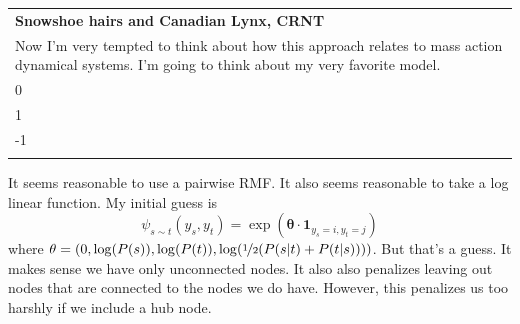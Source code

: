 \documentclass[10pt]{article}
\theoremstyle{definition}
\numberwithin{theorem}{section}
\numberwithin{definition}{section}
\numberwithin{lemma}{section}
\numberwithin{corollary}{section}
\numberwithin{clm}{section}
\numberwithin{rmk}{section}
\newenvironment{inbox}[1]
{\begin{center}
		\begin{tabular}{|p{0.9\textwidth}|}
			\hline
			{\bf #1}\\
		}
		{ 
			\\\\\hline
		\end{tabular} 
	\end{center}
}
\newcommand{\nhalf}{\nicefrac{1}{2}}
\renewcommand{\b}{\bm}
\newcommand{\ka}{\kappa}
\begin{document}
\begin{inbox}{Snowshoe hairs and Canadian Lynx, CRNT}
Now I'm very tempted to think about how this approach relates to mass action dynamical systems. I'm going to think about my very favorite model.
\[
\b{\dot{x}} = \ka_1 x \begin{pmatrix} 1 \\ 0 \end{pmatrix} + \ka_2 xy \begin{pmatrix}
-1 \\ 1
\end{pmatrix} + \ka_3 y \begin{pmatrix}
0\\-1
\end{pmatrix}
\]
Well. Yes. But there is only one maximal clique so $P(\b{x}) = \psi (\b{x})$ and that's just whatever it is. We know that it evolves according to the stochastic mass action equations. In fact, the result that the stationary distribution is a product of poissons for a complex balanced system can be thought of as fitting into this framework. I wonder if you could use this theory to re-prove that? Recall that the stationary distribution for a complex balanced system with equilibrium $\b{c}$ is 
\[
\pi(\b{x}) = \frac{1}{Z} \prod_{i=1}^d \frac{c_i^{x_i}}{x_i!}
\]
so here we have that
\[
\psi_c = \prod_{i \in c} \frac{c_i^{x_i}}{x_i!}
\]
or taking cliques to be just singletons
\[
\psi_i = \frac{c_i^{x_i}}{x_i !}
\]	
I can't think of any way to arrive upon that directly, and so prove the result from this direction. Also, This is even more general than a MRF, as it has self-loops. Self loops play the role of time update. In fact, one might say that a MC is to a MRF as an ODE is to a PDE. Then, self loops in the MRF correspond to time derivatives or forcing appearing in the PDE.
\end{inbox}

It seems reasonable to use a pairwise RMF. It also seems reasonable to take a log linear function. My initial guess is
\[
\psi_{s\sim t} (y_s,y_t) = \exp(\b{\theta} \cdot \b{1}_{y_s = i,y_t = j})
\]
where $\theta = (0,\log(P(s)), \log(P(t)),\log(\nhalf(P(s|t) + P(t|s))))$. But that's a guess. It makes sense we have only unconnected nodes. It also also penalizes leaving out nodes that are connected to the nodes we do have. However, this penalizes us too harshly if we include a hub node.
\end{document}

